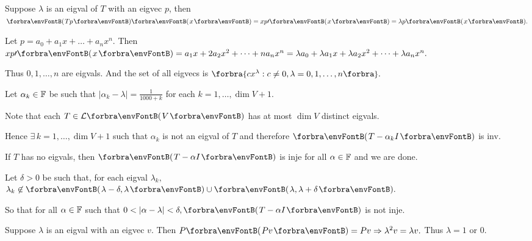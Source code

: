 \documentclass[a4paper, 11pt, UTF8]{article}
\begin{document}
\begin{large}
\par\quad
Suppose $\lambda$ is an eigval of $T$ with an eigvec $p$, then $\Par{Tp}\Par{x}=xp\apostrophe\Par{x}=\lambda p\Par{x}.$\par\quad
Let $p=a_0+a_1 x+\dots+a_n x^n.$ Then $xp\apostrophe\Par{x}=a_1 x+2a_2 x^2+\dots+n a_n x^n=\lambda a_0+\lambda a_1 x+\lambda a_2 x^2+\dots+\lambda a_n x^n.$\par\quad
Thus $0,1,\dots,n$ are eigvals. And the set of all eigvecs is $\Bra{cx^\lambda:c\neq 0,\lambda=0,1,\dots,n}.$\PfEnd
\SepLine

\par\quad
Let $\alpha_k\in{\mathbb{F}}$ be such that $\left|\alpha_k-\lambda\right|=\displaystyle\frac{1}{1000+k}$ for each $k=1,\dots,\dim V+1.$\par\vspace{6pt}\quad
Note that each $T\in\Lm{V}$ has at most $\dim V$ distinct eigvals.\par\quad
Hence $\exists\,k=1,\dots,\dim V+1$ such that $\alpha_k$ is not an eigval of $T$ and therefore $\Par{T-\alpha_k I}$ is inv.\PfEnd
\SepLine

\par\quad
If $T$ has no eigvals, then $\Par{T-\alpha I}$ is inje for all $\alpha\in{\mathbb{F}}$ and we are done.\par\quad
Let $\delta>0$ be such that, for each eigval $\lambda_k,$ $\lambda_k\not\in\Par{\lambda-\delta,\lambda}\cup \Par{\lambda,\lambda+\delta}.$\par\quad
So that for all $\alpha\in{\mathbb{F}}$ such that $0<\left|\alpha-\lambda\right|<\delta,\Par{T-\alpha I}$ is not inje.\PfEnd
\SepLine

Suppose $\lambda$ is an eigval with an eigvec $v.$ Then $P\Par{Pv}=Pv\Rightarrow\lambda^2 v=\lambda v.$ Thus $\lambda=1$ or $0.$\PfEnd
\SepLine


\end{large}
\end{document}
